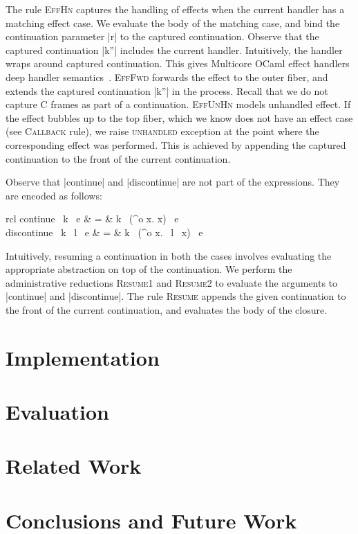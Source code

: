 \documentclass[sigplan,10pt,review,anonymous]{acmart}\settopmatter{printfolios=true,printccs=false,printacmref=false}
\newenvironment{nop}{}{}
\newenvironment{smathpar}{
\begin{nop}\small\begin{mathpar}}{
\end{mathpar}\end{nop}\ignorespacesafterend}
\newcommand{\olam}[2]{\lambda^o #1. #2}
\newcommand{\kw}[1]{\text{\bf #1}}
\newcommand{\throw}[2]{\kw{raise} ~#1 ~#2}
\begin{document}
The rule \textsc{EffHn} captures the handling of effects when the current
handler has a matching effect case. We evaluate the body of the matching case,
and bind the continuation parameter |r| to the captured continuation. Observe
that the captured continuation |k''| includes the current handler. Intuitively,
the handler wraps around captured continuation. This gives Multicore OCaml
effect handlers deep handler semantics~\cite{}. \textsc{EffFwd} forwards the
effect to the outer fiber, and extends the captured continuation |k''| in the
process. Recall that we do not capture C frames as part of a continuation.
\textsc{EffUnHn} models unhandled effect. If the effect bubbles up to the top
fiber, which we know does not have an effect case (see \textsc{Callback} rule),
we raise \textsc{unhandled} exception at the point where the corresponding
effect was performed. This is achieved by appending the captured continuation
to the front of the current continuation.

Observe that |continue| and |discontinue| are not part of the expressions. They
are encoded as follows:
\begin{smathpar}
	\begin{array}{rcl}
		\textsf{continue} ~k ~e & = & k ~(\olam{x}{x}) ~e \\
		\textsf{discontinue} ~k ~l ~e & = & k ~(\olam{x}{\throw{l}{x}}) ~e
	\end{array}
\end{smathpar}

Intuitively, resuming a continuation in both the cases involves evaluating the
appropriate abstraction on top of the continuation. We perform the
administrative reductions \textsc{Resume1} and \textsc{Resume2} to evaluate the
arguments to |continue| and |discontinue|. The rule \textsc{Resume} appends the
given continuation to the front of the current continuation, and evaluates the
body of the closure.

\section{Implementation}
\label{sec:impl}

\section{Evaluation}
\label{sec:eval}

\section{Related Work}
\label{sec:related}

\section{Conclusions and Future Work}
\label{sec:conc}



\end{document}

